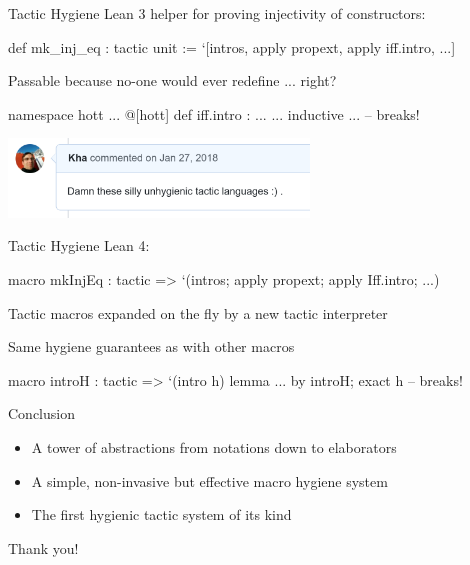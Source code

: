 \documentclass[t]{beamer}
\newcommand{\kit}[1]{\textcolor{KITgreen}{#1}}
\begin{document}
\begin{frame}{Tactic Hygiene}
  Lean 3 helper for proving injectivity of constructors:
\begin{leancode}
def mk_inj_eq : tactic unit :=
`[intros, apply propext, apply iff.intro, ...]
\end{leancode}
  Passable because no-one would ever redefine ... right?
  \vfill
  \pause
\begin{leancode}
namespace hott
...
@[hott] def iff.intro : ...
...
inductive ... -- breaks!
\end{leancode}
  \pause
  \includegraphics[width=0.6\textwidth]{damn.png}
\end{frame}

\begin{frame}[fragile]{Tactic Hygiene}
  Lean 4:
\begin{leancode}
macro mkInjEq : tactic =>
`(intros; apply propext; apply Iff.intro; ...)
\end{leancode}
  Tactic macros expanded on the fly by a new \kit{tactic interpreter}

  Same hygiene guarantees as with other macros
  \pause
  \vfill
\begin{leancode}
macro introH : tactic => `(intro h)
lemma ... by introH; exact h  -- breaks!
\end{leancode}
  \pause
{}
\end{frame}

\begin{frame}{Conclusion}
  \begin{itemize}
  \item A tower of abstractions from notations down to elaborators
  \item A simple, non-invasive but effective macro hygiene system
  \item The first hygienic tactic system of its kind
  \end{itemize}
  \vfill
  \pause
  \begin{center}
    \Huge{Thank you!}
  \end{center}
\end{frame}
\end{document}
